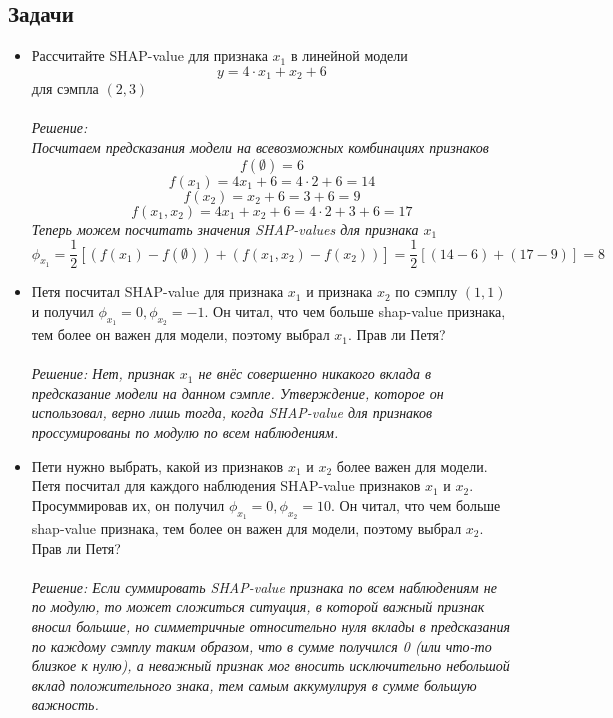\subsection*{Задачи}
\begin{itemize}
    \item Рассчитайте SHAP-value для признака $x_1$ в линейной модели 
    $$y = 4 \cdot x_1 + x_2 + 6$$ для сэмпла $(2, 3)$\\\\
    \textit{Решение:\\
    Посчитаем предсказания модели на всевозможных комбинациях признаков
    $$ f(\emptyset) = 6 $$  
    $$ f(x_1) = 4x_1 + 6 = 4 \cdot 2 + 6 = 14 $$
    $$ f(x_2) = x_2 + 6 = 3 + 6 = 9 $$
    $$ f(x_1, x_2) = 4x_1 + x_2 + 6 = 4 \cdot 2 + 3 + 6 = 17 $$
    Теперь можем посчитать значения SHAP-values для признака $x_1$
    $$
    \phi_{x_1} = \frac{1}{2} \left[ (f(x_1) - f(\emptyset)) + (f(x_1, x_2) - f(x_2)) \right] = \frac{1}{2} \left[ (14 - 6) + (17 - 9)\right] = \boxed{8}
    $$}

    \item Петя посчитал SHAP-value для признака $x_1$ и признака $x_2$ по сэмплу $(1, 1)$ и получил $\phi_{x_1} = 0, \phi_{x_2} = -1$. Он читал, что чем больше shap-value признака, тем более он важен для модели, поэтому выбрал $x_1$. Прав ли Петя?\\\\
    \textit{Решение: Нет, признак $x_1$ не внёс совершенно никакого вклада в предсказание модели на данном сэмпле. Утверждение, которое он использовал, верно лишь тогда, когда SHAP-value для признаков проссумированы по модулю по всем наблюдениям.}
    
    \item Пети нужно выбрать, какой из признаков $x_1$ и $x_2$ более важен для модели. Петя посчитал для каждого наблюдения SHAP-value признаков $x_1$ и $x_2$. Просуммировав их, он получил $\phi_{x_1} = 0, \phi_{x_2} = 10$. Он читал, что чем больше shap-value признака, тем более он важен для модели, поэтому выбрал $x_2$. Прав ли Петя?\\\\
    \textit{Решение: Если суммировать SHAP-value признака по всем наблюдениям не по модулю, то может сложиться ситуация, в которой важный признак вносил большие, но симметричные относительно нуля вклады в предсказания по каждому сэмплу таким образом, что в сумме получился 0 (или что-то близкое к нулю), а неважный признак мог вносить исключительно небольшой вклад положительного знака, тем самым аккумулируя в сумме большую важность.} 
\end{itemize}



